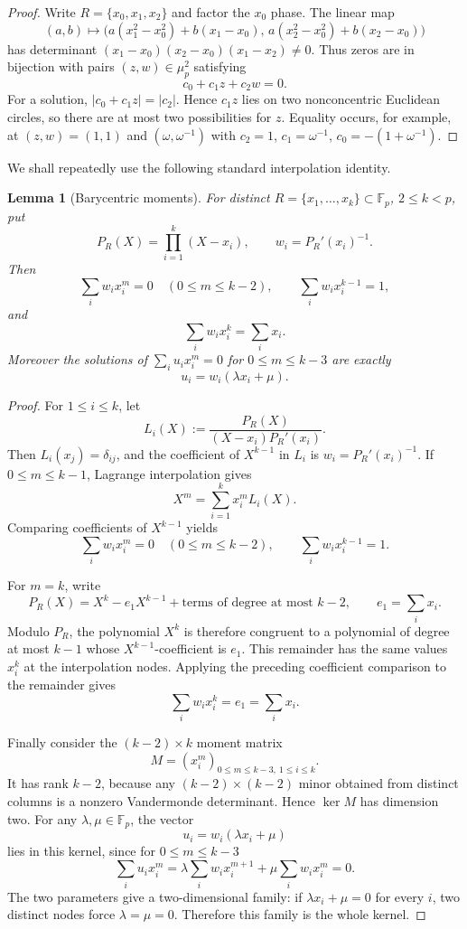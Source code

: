 \documentclass[11pt]{article}
\newtheorem{lemma}[theorem]{Lemma}
\newcommand{\F}{\mathbb F}
\begin{document}
\begin{proof}
Write $R=\{x_0,x_1,x_2\}$ and factor the $x_0$ phase.  The linear map
\[
 (a,b)\longmapsto
 \bigl(a(x_1^2-x_0^2)+b(x_1-x_0),\,
       a(x_2^2-x_0^2)+b(x_2-x_0)\bigr)
\]
has determinant $(x_1-x_0)(x_2-x_0)(x_1-x_2)\ne0$.  Thus zeros are in bijection with pairs $(z,w)\in\mu_p^2$ satisfying
\[
 c_0+c_1z+c_2w=0.
\]
For a solution, $|c_0+c_1z|=|c_2|$.  Hence $c_1z$ lies on two nonconcentric Euclidean circles, so there are at most two possibilities for $z$.  Equality occurs, for example, at $(z,w)=(1,1)$ and $(\omega,\omega^{-1})$ with $c_2=1$, $c_1=\omega^{-1}$, $c_0=-(1+\omega^{-1})$.
\end{proof}

We shall repeatedly use the following standard interpolation identity.

\begin{lemma}[Barycentric moments]
\label{lem:barycentric-moments}
For distinct $R=\{x_1,\ldots,x_k\}\subset\F_p$, $2\le k<p$, put
\[
 P_R(X)=\prod_{i=1}^k(X-x_i),\qquad w_i=P_R'(x_i)^{-1}.
\]
Then
\[
 \sum_iw_ix_i^m=0\quad(0\le m\le k-2),\qquad
 \sum_iw_ix_i^{k-1}=1,
\]
and
\[
 \sum_iw_ix_i^k=\sum_ix_i.
\]
Moreover the solutions of $\sum_iu_ix_i^m=0$ for $0\le m\le k-3$ are exactly
\[
 u_i=w_i(\lambda x_i+\mu).
\]
\end{lemma}

\begin{proof}
For \(1\le i\le k\), let
\[
 L_i(X):=\frac{P_R(X)}{(X-x_i)P_R'(x_i)}.
\]
Then \(L_i(x_j)=\delta_{ij}\), and the coefficient of \(X^{k-1}\) in
\(L_i\) is \(w_i=P_R'(x_i)^{-1}\).  If \(0\le m\le k-1\), Lagrange
interpolation gives
\[
 X^m=\sum_{i=1}^k x_i^mL_i(X).
\]
Comparing coefficients of \(X^{k-1}\) yields
\[
 \sum_iw_ix_i^m=0\quad(0\le m\le k-2),
 \qquad
 \sum_iw_ix_i^{k-1}=1.
\]

For \(m=k\), write
\[
 P_R(X)=X^k-e_1X^{k-1}+\text{terms of degree at most }k-2,
 \qquad
 e_1=\sum_i x_i.
\]
Modulo \(P_R\), the polynomial \(X^k\) is therefore congruent to a
polynomial of degree at most \(k-1\) whose \(X^{k-1}\)-coefficient is
\(e_1\).  This remainder has the same values \(x_i^k\) at the interpolation
nodes.  Applying the preceding coefficient comparison to the remainder gives
\[
 \sum_iw_ix_i^k=e_1=\sum_i x_i.
\]

Finally consider the \((k-2)\times k\) moment matrix
\[
 M=(x_i^m)_{0\le m\le k-3,\ 1\le i\le k}.
\]
It has rank \(k-2\), because any \((k-2)\times(k-2)\) minor obtained from
distinct columns is a nonzero Vandermonde determinant.  Hence \(\ker M\) has
dimension two.  For any \(\lambda,\mu\in\F_p\), the vector
\[
 u_i=w_i(\lambda x_i+\mu)
\]
lies in this kernel, since for \(0\le m\le k-3\)
\[
 \sum_i u_ix_i^m
 =\lambda\sum_iw_ix_i^{m+1}+\mu\sum_iw_ix_i^m=0.
\]
The two parameters give a two-dimensional family: if
\(\lambda x_i+\mu=0\) for every \(i\), two distinct nodes force
\(\lambda=\mu=0\).  Therefore this family is the whole kernel.
\end{proof}
\end{document}
